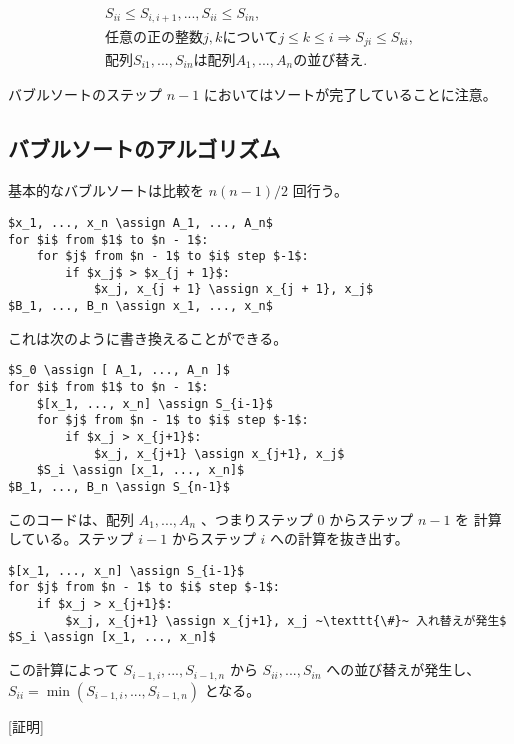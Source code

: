\documentclass{jsarticle}
\begin{document}
\begin{eqnarray}
S_{ii} \le S_{i,i+1}, ..., S_{ii} \le S_{in}, \\
任意の正の整数 j, k について j \le k \le i \Longrightarrow S_{ji} \le S_{ki}, \\
配列 S_{i1}, ..., S_{in} は配列 A_1, ..., A_n の並び替え.
\end{eqnarray}

バブルソートのステップ $n-1$ においてはソートが完了していることに注意。

\subsection{バブルソートのアルゴリズム}

基本的なバブルソートは比較を $n(n - 1) / 2$ 回行う。

\begin{lstlisting}[mathescape]
$x_1, ..., x_n \assign A_1, ..., A_n$
for $i$ from $1$ to $n - 1$:
    for $j$ from $n - 1$ to $i$ step $-1$:
        if $x_j$ > $x_{j + 1}$:
            $x_j, x_{j + 1} \assign x_{j + 1}, x_j$
$B_1, ..., B_n \assign x_1, ..., x_n$
\end{lstlisting}

これは次のように書き換えることができる。

\begin{lstlisting}[mathescape]
$S_0 \assign [ A_1, ..., A_n ]$
for $i$ from $1$ to $n - 1$:
    $[x_1, ..., x_n] \assign S_{i-1}$
    for $j$ from $n - 1$ to $i$ step $-1$:
        if $x_j > x_{j+1}$:
            $x_j, x_{j+1} \assign x_{j+1}, x_j$
    $S_i \assign [x_1, ..., x_n]$
$B_1, ..., B_n \assign S_{n-1}$
\end{lstlisting}

このコードは、配列 $A_1, ..., A_n$ 、つまりステップ $0$ からステップ $n-1$ を
計算している。ステップ $i - 1$ からステップ $i$ への計算を抜き出す。

\begin{lstlisting}[mathescape]
$[x_1, ..., x_n] \assign S_{i-1}$
for $j$ from $n - 1$ to $i$ step $-1$:
    if $x_j > x_{j+1}$:
        $x_j, x_{j+1} \assign x_{j+1}, x_j ~\texttt{\#}~ 入れ替えが発生$
$S_i \assign [x_1, ..., x_n]$
\end{lstlisting}

この計算によって $S_{i-1, i}, ..., S_{i-1, n}$ から
$S_{ii}, ..., S_{in}$ への並び替えが発生し、
$S_{ii} = \min (S_{i-1, i}, ..., S_{i-1, n})$ となる。

[証明]
\end{document}

